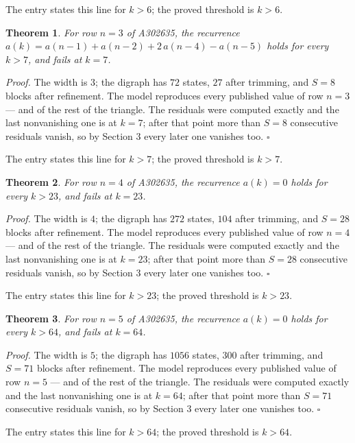 \documentclass[11pt]{article}
\newtheorem{theorem}{Theorem}
\theoremstyle{definition}
\begin{document}
The entry states this line for $k > 6$; the proved threshold is $k > 6$.

\begin{theorem} For row $n = 3$ of A302635, the recurrence $a(k) = a(n-1) + a(n-2) + 2\,a(n-4) - a(n-5)$ holds for every $k > 7$, and fails at $k = 7$.\end{theorem}

{\itshape Proof.} The width is $3$; the digraph has $72$ states, $27$ after trimming, and $S = 8$ blocks after refinement. The model reproduces every published value of row $n = 3$ --- and of the rest of the triangle. The residuals were computed exactly and the last nonvanishing one is at $k = 7$; after that point more than $S = 8$ consecutive residuals vanish, so by Section 3 every later one vanishes too. $\square$

The entry states this line for $k > 7$; the proved threshold is $k > 7$.

\begin{theorem} For row $n = 4$ of A302635, the recurrence $a(k) = 0$ holds for every $k > 23$, and fails at $k = 23$.\end{theorem}

{\itshape Proof.} The width is $4$; the digraph has $272$ states, $104$ after trimming, and $S = 28$ blocks after refinement. The model reproduces every published value of row $n = 4$ --- and of the rest of the triangle. The residuals were computed exactly and the last nonvanishing one is at $k = 23$; after that point more than $S = 28$ consecutive residuals vanish, so by Section 3 every later one vanishes too. $\square$

The entry states this line for $k > 23$; the proved threshold is $k > 23$.

\begin{theorem} For row $n = 5$ of A302635, the recurrence $a(k) = 0$ holds for every $k > 64$, and fails at $k = 64$.\end{theorem}

{\itshape Proof.} The width is $5$; the digraph has $1056$ states, $300$ after trimming, and $S = 71$ blocks after refinement. The model reproduces every published value of row $n = 5$ --- and of the rest of the triangle. The residuals were computed exactly and the last nonvanishing one is at $k = 64$; after that point more than $S = 71$ consecutive residuals vanish, so by Section 3 every later one vanishes too. $\square$

The entry states this line for $k > 64$; the proved threshold is $k > 64$.
\end{document}
